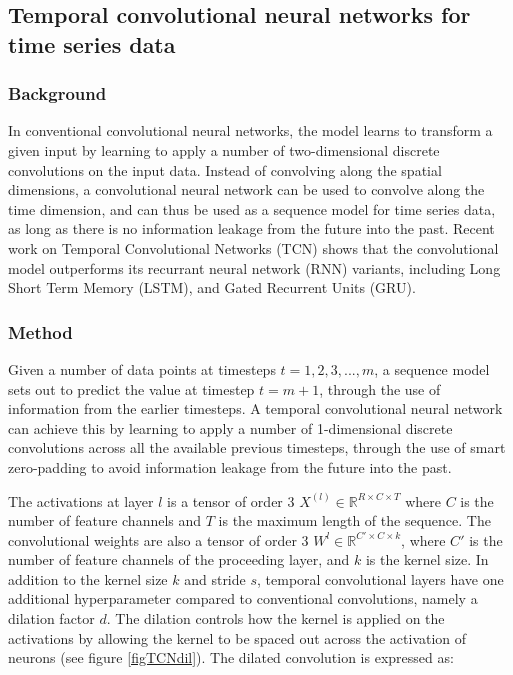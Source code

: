 \documentclass[a4paper, twoside]{article}
\begin{document}
\subsection{Temporal convolutional neural networks for time series data}
\subsubsection{Background}
In conventional convolutional neural networks, the model learns to transform a given input by learning to apply a number of two-dimensional discrete convolutions on the input data. Instead of convolving along the spatial dimensions, a convolutional neural network can be used to convolve along the time dimension, and can thus be used as a sequence model for time series data, as long as there is no information leakage from the future into the past. Recent work on Temporal Convolutional Networks (TCN) \cite{tcn} shows that the convolutional model outperforms its recurrant neural network (RNN) variants, including Long Short Term Memory (LSTM), and Gated Recurrent Units (GRU). 

\subsubsection{Method}
Given a number of data points at timesteps $t = 1, 2, 3, ..., m$, a sequence model sets out to predict the value at timestep $t = m+1$, through the use of information from the earlier timesteps. A temporal convolutional neural network can achieve this by learning to apply a number of 1-dimensional discrete convolutions across all the available previous timesteps, through the use of smart zero-padding to avoid information leakage from the future into the past.

The activations at layer $l$ is a tensor of order 3 $X^{(l)} \in \mathbb{R}^{R \times C \times T}$ where $C$ is the number of feature channels and $T$ is the maximum length of the sequence. The convolutional weights are also a tensor of order 3 $W^l \in \mathbb{R}^{C' \times C \times k}$, where $C'$ is the number of feature channels of the proceeding layer, and $k$ is the kernel size. In addition to the kernel size $k$ and stride $s$, temporal convolutional layers have one additional hyperparameter compared to conventional convolutions, namely a dilation factor $d$. The dilation controls how the kernel is applied on the activations by allowing the kernel to be spaced out across the activation of neurons (see figure \ref{figTCNdil}). The dilated convolution is expressed as:
\end{document}

